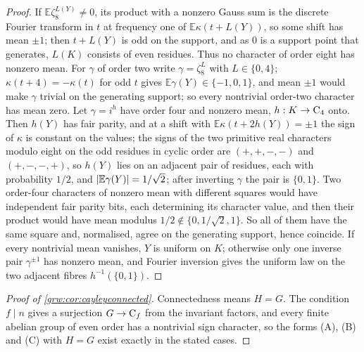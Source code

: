 
\begin{proof}
If $\mathbb E\zeta_8^{L(Y)}\ne0$, its product with a nonzero Gauss sum is
the discrete Fourier transform in $t$ at frequency one of
$\mathbb E\kappa(t+L(Y))$, so some shift has mean $\pm1$; then $t+L(Y)$ is
odd on the support, and as $0$ is a support point that generates, $L(K)$
consists of even residues. Thus no character of order eight has nonzero
mean. For $\gamma$ of order two write $\gamma=\zeta_8^L$ with $L\in\{0,4\}$;
$\kappa(t+4)=-\kappa(t)$ for odd $t$ gives $\mathbb E\gamma(Y)\in\{-1,0,1\}$,
and mean $\pm1$ would make $\gamma$ trivial on the generating support;
so every nontrivial order-two character has mean zero. Let $\gamma=i^h$
have order four and nonzero mean, $h:K\to\mathrm{C}_4$ onto. Then $h(Y)$ has
fair parity, and at a shift with $\mathbb E\kappa(t+2h(Y))=\pm1$ the sign of
$\kappa$ is constant on the values; the signs of the two primitive real
characters modulo eight on the odd residues in cyclic order are
$(+,+,-,-)$ and $(+,-,-,+)$, so $h(Y)$ lies on an adjacent pair of
residues, each with probability $1/2$, and $\lvert\mathbb E\gamma(Y)\rvert=1/\sqrt2$;
after inverting $\gamma$ the pair is $\{0,1\}$. Two order-four characters
of nonzero mean with different squares would have independent fair parity
bits, each determining its character value, and then their product would
have mean modulus $1/2\notin\{0,1/\sqrt2,1\}$. So all of them have the
same square and, normalised, agree on the generating support, hence
coincide. If every nontrivial mean vanishes, $Y$ is uniform on $K$;
otherwise only one inverse pair $\gamma^{\pm1}$ has nonzero mean, and
Fourier inversion gives the uniform law on the two adjacent fibres
$h^{-1}(\{0,1\})$.
\end{proof}

\begin{proof}[Proof of \cref{grw:cor:cayleyconnected}]
Connectedness means $H=G$. The condition $f\mid n$ gives a surjection
$G\to\mathrm{C}_f$ from the invariant factors, and every finite abelian group
of even order has a nontrivial sign character, so the forms (A), (B) and
(C) with $H=G$ exist exactly in the stated cases.
\end{proof}

